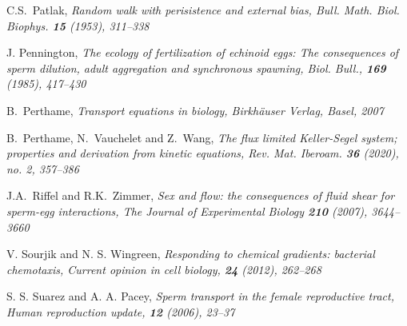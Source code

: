 \documentclass[12pt,reqno]{amsart}
\begin{document}
\begin{thebibliography}{[MT]}
 C.S.~Patlak, \it Random walk with perisistence and external bias, \rm Bull. Math. Biol. Biophys. {\bf 15} (1953), 311--338


 J. Pennington, \it The ecology of fertilization of echinoid eggs: The consequences of sperm dilution, adult aggregation and synchronous spawning, \rm
Biol. Bull., {\bf 169} (1985), 417--430


 B.~Perthame, \it Transport equations in biology, \rm Birkh\"auser Verlag, Basel, 2007

 B.~Perthame, N.~Vauchelet and Z.~Wang, \it
The flux limited Keller-Segel system; properties and
derivation from kinetic equations, \rm Rev. Mat. Iberoam. {\bf 36} (2020), no. 2, 357--386



 J.A.~Riffel and R.K.~Zimmer, \it Sex and flow: the consequences of fluid shear for sperm-egg interactions,
\rm The Journal of Experimental Biology {\bf 210} (2007), 3644--3660


 V. Sourjik and N. S. Wingreen, \it Responding to chemical gradients: bacterial chemotaxis, \rm Current
opinion in cell biology, {\bf 24} (2012), 262--268

 S. S. Suarez and A. A. Pacey, \it Sperm transport in the female reproductive tract, \rm  Human reproduction
update, {\bf 12} (2006), 23--37



\end{thebibliography}
\end{document}
